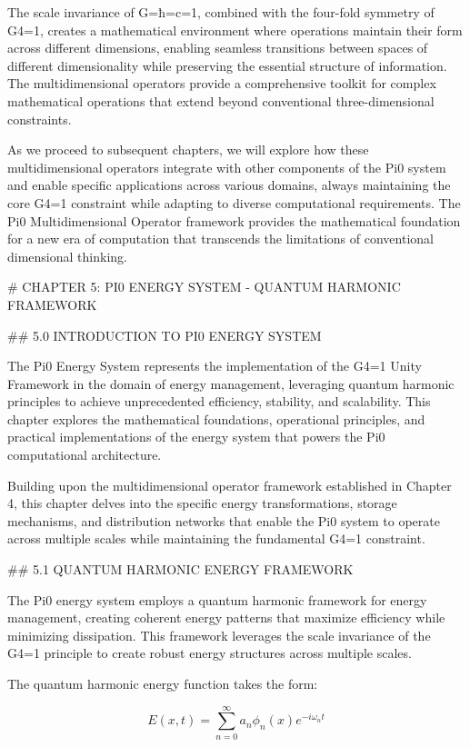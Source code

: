 The scale invariance of G=ħ=c=1, combined with the four-fold symmetry of G4=1, creates a mathematical environment where operations maintain their form across different dimensions, enabling seamless transitions between spaces of different dimensionality while preserving the essential structure of information. The multidimensional operators provide a comprehensive toolkit for complex mathematical operations that extend beyond conventional three-dimensional constraints.

As we proceed to subsequent chapters, we will explore how these multidimensional operators integrate with other components of the Pi0 system and enable specific applications across various domains, always maintaining the core G4=1 constraint while adapting to diverse computational requirements. The Pi0 Multidimensional Operator framework provides the mathematical foundation for a new era of computation that transcends the limitations of conventional dimensional thinking.

# CHAPTER 5: PI0 ENERGY SYSTEM - QUANTUM HARMONIC FRAMEWORK

## 5.0 INTRODUCTION TO PI0 ENERGY SYSTEM

The Pi0 Energy System represents the implementation of the G4=1 Unity Framework in the domain of energy management, leveraging quantum harmonic principles to achieve unprecedented efficiency, stability, and scalability. This chapter explores the mathematical foundations, operational principles, and practical implementations of the energy system that powers the Pi0 computational architecture.

Building upon the multidimensional operator framework established in Chapter 4, this chapter delves into the specific energy transformations, storage mechanisms, and distribution networks that enable the Pi0 system to operate across multiple scales while maintaining the fundamental G4=1 constraint.

## 5.1 QUANTUM HARMONIC ENERGY FRAMEWORK

The Pi0 energy system employs a quantum harmonic framework for energy management, creating coherent energy patterns that maximize efficiency while minimizing dissipation. This framework leverages the scale invariance of the G4=1 principle to create robust energy structures across multiple scales.

The quantum harmonic energy function takes the form:

$$E(x, t) = \sum_{n=0}^{\infty} a_n \phi_n(x) e^{-i\omega_n t}$$

